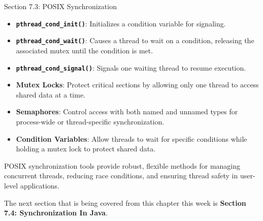 \begin{notes}{Section 7.3: POSIX Synchronization}
    \begin{highlight}
    
        \begin{itemize}
            \item \textbf{\texttt{pthread\_cond\_init()}}: Initializes a condition variable for signaling.
            \item \textbf{\texttt{pthread\_cond\_wait()}}: Causes a thread to wait on a condition, releasing the associated mutex until the condition is met.
            \item \textbf{\texttt{pthread\_cond\_signal()}}: Signals one waiting thread to resume execution.
        \end{itemize}
    
    \end{highlight}
    
    \begin{highlight}
    
        \begin{itemize}
            \item \textbf{Mutex Locks}: Protect critical sections by allowing only one thread to access shared data at a time.
            \item \textbf{Semaphores}: Control access with both named and unnamed types for process-wide or thread-specific synchronization.
            \item \textbf{Condition Variables}: Allow threads to wait for specific conditions while holding a mutex lock to protect shared data.
        \end{itemize}
    
    POSIX synchronization tools provide robust, flexible methods for managing concurrent threads, reducing race conditions, and ensuring thread safety in user-level applications.
    
    \end{highlight}
\end{notes}

The next section that is being covered from this chapter this week is \textbf{Section 7.4: Synchronization In Java}.

